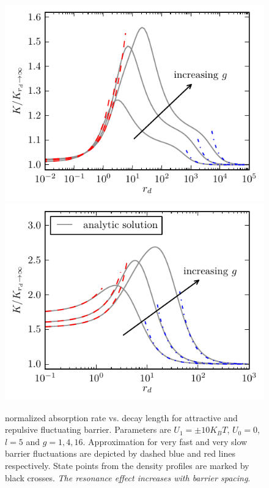 \documentclass[twocolumn,superscriptaddress]{revtex4}
\begin{document}
\begin{figure}[H]
\includegraphics[width= .5 \textwidth]{plots/g_ab_rates.pdf}
\includegraphics[width= .5 \textwidth]{plots/g_rb_rates.pdf}
\caption{normalized absorption rate vs. decay length for attractive and repulsive fluctuating barrier. \newline Parameters are $U_1 = \pm 10 K_B T$, $U_0= 0$, $l = 5$ and $g=1,4,16$. Approximation for very fast and very slow barrier fluctuations are depicted by dashed blue and red lines respectively. State points from the density profiles are marked by black crosses. \emph{The resonance effect increases with barrier spacing}.}
\label{fig3c}
\end{figure}
\end{document}
